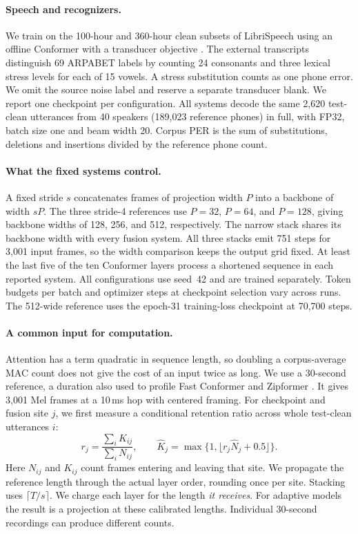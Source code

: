 \documentclass[11pt]{article}
\begin{document}
\paragraph{Speech and recognizers.}
We train on the 100-hour and 360-hour clean subsets of LibriSpeech \citep{panayotov-etal-2015-librispeech} using an offline Conformer \citep{gulati20_interspeech} with a transducer objective \citep{graves-2012-rnnt}. The external transcripts distinguish 69 ARPABET labels by counting 24 consonants and three lexical stress levels for each of 15 vowels. A stress substitution counts as one phone error. We omit the source noise label and reserve a separate transducer blank. We report one checkpoint per configuration. All systems decode the same 2,620 test-clean utterances from 40 speakers (189,023 reference phones) in full, with FP32, batch size one and beam width 20. Corpus PER is the sum of substitutions, deletions and insertions divided by the reference phone count.

\paragraph{What the fixed systems control.}
A fixed stride $s$ concatenates frames of projection width $P$ into a backbone of width $sP$. The three stride-4 references use $P=32$, $P=64$, and $P=128$, giving backbone widths of 128, 256, and 512, respectively. The narrow stack shares its backbone width with every fusion system. All three stacks emit 751 steps for 3,001 input frames, so the width comparison keeps the output grid fixed. At least the last five of the ten Conformer layers process a shortened sequence in each reported system. All configurations use seed~42 and are trained separately. Token budgets per batch and optimizer steps at checkpoint selection vary across runs. The 512-wide reference uses the epoch-31 training-loss checkpoint at 70,700 steps.

\paragraph{A common input for computation.}
Attention has a term quadratic in sequence length, so doubling a corpus-average MAC count does not give the cost of an input twice as long. We use a 30-second reference, a duration also used to profile Fast Conformer and Zipformer \citep{rekesh-etal-2023-fast,yao-etal-2024-zipformer}. It gives 3,001 Mel frames at a 10\,ms hop with centered framing. For checkpoint and fusion site $j$, we first measure a conditional retention ratio across whole test-clean utterances $i$:
\begin{equation}
 r_j=\frac{\sum_i K_{ij}}{\sum_i N_{ij}},
 \qquad
 \widehat K_j=\max\{1,\lfloor r_j\widehat N_j+0.5\rfloor\}.
 \label{eq:retain}
\end{equation}
Here $N_{ij}$ and $K_{ij}$ count frames entering and leaving that site. We propagate the reference length through the actual layer order, rounding once per site. Stacking uses $\lceil T/s\rceil$. We charge each layer for the length \emph{it receives}. For adaptive models the result is a projection at these calibrated lengths. Individual 30-second recordings can produce different counts.
\end{document}
